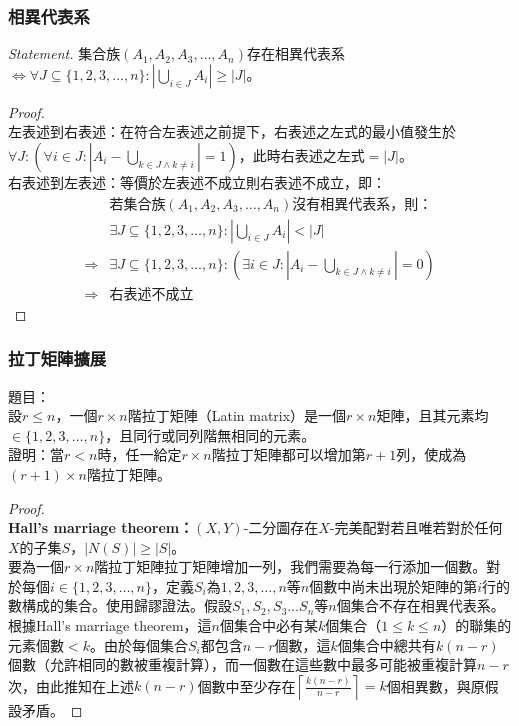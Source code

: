 \documentclass[a4paper,12pt]{report}
\begin{document}
\subsubsection{相異代表系}
\textit{Statement. }集合族$(A_1, A_2, A_3, \ldots, A_n)$存在相異代表系$\Leftrightarrow \forall J\subseteq \{1, 2, 3, \ldots, n\}: \left|\bigcup_{i\in J} A_i\right|\geq \left|J\right|$。
\begin{proof}\mbox{}\\
左表述到右表述：在符合左表述之前提下，右表述之左式的最小值發生於$\forall J: \left(\forall i \in J: \left|A_i - \bigcup_{k\in J\wedge k\neq i}\right|=1\right)$，此時右表述之左式$=|J|$。 \\
右表述到左表述：等價於左表述不成立則右表述不成立，即：
\[
\begin{aligned}
&\text{若集合族}(A_1, A_2, A_3, \ldots, A_n)\text{沒有相異代表系，則：}　\\
& \exists J\subseteq \{1, 2, 3, \ldots, n\}: \left|\bigcup_{i\in J} A_i\right|< \left|J\right| \\
\Rightarrow & \exists J\subseteq \{1, 2, 3, \ldots, n\}: \left(\exists i \in J: \left|A_i - \bigcup_{k\in J\wedge k\neq i}\right|=0\right) \\
\Rightarrow & \text{右表述不成立}
\end{aligned}
\]
\end{proof}
\subsubsection{拉丁矩陣擴展}
題目：\\
設$r\leq n$，一個$r\times n$階拉丁矩陣（Latin matrix）是一個$r\times n$矩陣，且其元素均$\in \{1, 2, 3, \ldots, n\}$，且同行或同列階無相同的元素。 \\
證明：當$r<n$時，任一給定$r\times n$階拉丁矩陣都可以增加第$r+1$列，使成為$(r+1)\times n$階拉丁矩陣。
\begin{proof}\mbox{}\\
\textbf{Hall's marriage theorem：}$(X, Y)$-二分圖存在$X$-完美配對若且唯若對於任何$X$的子集$S$，$|N(S)|\geq|S|$。 \\
要為一個$r\times n$階拉丁矩陣拉丁矩陣增加一列，我們需要為每一行添加一個數。對於每個$i \in \{1, 2, 3, \ldots, n\}$，定義$S_i$為$1, 2, 3, \ldots, n$等$n$個數中尚未出現於矩陣的第$i$行的數構成的集合。使用歸謬證法。假設$S_1, S_2, S_3 \ldots S_n$等$n$個集合不存在相異代表系。根據Hall's marriage theorem，這$n$個集合中必有某$k$個集合（$1\leq k\leq n$）的聯集的元素個數$<k$。由於每個集合$S_i$都包含$n−r$個數，這$k$個集合中總共有$k(n-r)$個數（允許相同的數被重複計算），而一個數在這些數中最多可能被重複計算$n-r$次，由此推知在上述$k(n-r)$個數中至少存在$\left\lceil\frac{k(n-r)}{n-r}\right\rceil=k$個相異數，與原假設矛盾。
\end{proof}
\end{document}
